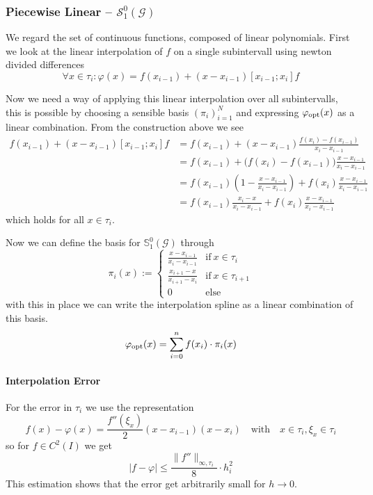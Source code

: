 \subsubsection{Piecewise Linear -- \(\mathcal{S}_1^0(\mathcal{G})\)}
We regard the set of continuous functions, composed of linear polynomials.
First we look at the linear interpolation of \(f\) on a single subintervall using newton divided differences
\[\forall x \in \tau_i: \varphi(x) = f(x_{i-1}) + (x - x_{i-1}) [x_{i-1}; x_i]f\]

Now we need a way of applying this linear interpolation over all subintervalls, this is possible by choosing a sensible basis \((\pi_i)^N_{i = 1}\) and expressing \(\varphi_{\operatorname{opt}}(x)\) as a linear combination.
From the construction above we see
\begin{equation*}
   \begin{split}
      f(x_{i-1}) + (x - x_{i-1}) [x_{i-1}; x_i]f & = f(x_{i-1}) + (x - x_{i-1}) \frac{f(x_i) - f(x_{i-1})}{x_i - x_{i-1}} \\
                                                 & = f(x_{i-1}) + \big(f(x_i) - f(x_{i-1})\big)\frac{x - x_{i-1}}{x_i - x_{i-1}} \\
                                                 & = f(x_{i-1}) \left(1 - \frac{x - x_{i-1}}{x_i - x_{i-1}}\right) + f(x_i) \frac{x - x_{i-1}}{x_i - x_{i-1}} \\
                                                 & = f(x_{i-1}) \frac{x_i - x}{x_i - x_{i-1}} + f(x_i) \frac{x - x_{i-1}}{x_i - x_{i-1}}
   \end{split}
\end{equation*}
which holds for all \(x \in \tau_i\).

Now we can define the basis for \(\mathbb{S}_1^0(\mathcal{G})\) through
\[\pi_i(x) := \begin{cases}\frac{x - x_{i-1}}{x_i - x_{i-1}} & \text{if}~x \in \tau_i\\ \frac{x_{i+1} - x}{x_{i+1} - x_i} & \text{if}~x \in \tau_{i+1}\\ 0 & \text{else}\end{cases}\]
with this in place we can write the interpolation spline as a linear combination of this basis.
\[\varphi_{\operatorname{opt}}(x) = \sum_{i = 0}^n f(x_i) \cdot \pi_i(x)\]

\paragraph{Interpolation Error}
For the error in \(\tau_i\) we use the representation
\[f(x) - \varphi(x) = \frac{f''(\xi_x)}{2} (x - x_{i-1})(x - x_i) \quad\text{with}\quad x \in \tau_i, \xi_x \in \tau_i\]
so for \(f \in C^2(I)\) we get
\begin{equation*}\label{eq:lin_spline_err}
   |f - \varphi| \leq \frac{\|f''\|_{\infty, \tau_i}}{8} \cdot h_i^2
\end{equation*}
This estimation shows that the error get arbitrarily small for \(h \to 0\).

